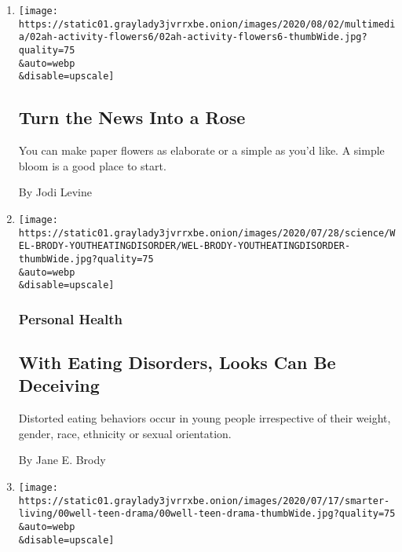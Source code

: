 \begin{enumerate}
\def\labelenumi{\arabic{enumi}.}
\item
  \href{/2020/08/01/at-home/coronavirus-paper-flowers.html}{}

  \texttt{[image: https://static01.graylady3jvrrxbe.onion/images/2020/08/02/multimedia/02ah-activity-flowers6/02ah-activity-flowers6-thumbWide.jpg?quality=75\\\&auto=webp\\\&disable=upscale]}

  \hypertarget{turn-the-news-into-a-rose}{%
  \subsection{Turn the News Into a
  Rose}\label{turn-the-news-into-a-rose}}

  You can make paper flowers as elaborate or a simple as you'd like. A
  simple bloom is a good place to start.

  By Jodi Levine
\item
  \href{/2020/07/27/well/eat/eating-disorders.html}{}

  \texttt{[image: https://static01.graylady3jvrrxbe.onion/images/2020/07/28/science/WEL-BRODY-YOUTHEATINGDISORDER/WEL-BRODY-YOUTHEATINGDISORDER-thumbWide.jpg?quality=75\\\&auto=webp\\\&disable=upscale]}

  \hypertarget{personal-health}{%
  \subsubsection{Personal Health}\label{personal-health}}

  \hypertarget{with-eating-disorders-looks-can-be-deceiving}{%
  \subsection{With Eating Disorders, Looks Can Be
  Deceiving}\label{with-eating-disorders-looks-can-be-deceiving}}

  Distorted eating behaviors occur in young people irrespective of their
  weight, gender, race, ethnicity or sexual orientation.

  By Jane E. Brody
\item
  \href{/2020/07/23/well/family/quarantine-tween-drama.html}{}

  \texttt{[image: https://static01.graylady3jvrrxbe.onion/images/2020/07/17/smarter-living/00well-teen-drama/00well-teen-drama-thumbWide.jpg?quality=75\\\&auto=webp\\\&disable=upscale]}

  \hypertarget{a-quarantine-benefit-lowering-the-flame-on-tween-drama}{%
}
\end{enumerate}
